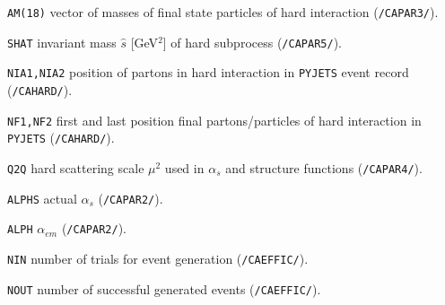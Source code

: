 \documentclass[11pt]{article} \usepackage{mystyle-new}
\newcommand{\deflab}[1]{#1\hfil}%
\newenvironment{defl}[1]%
  {\begin{list}{}{\settowidth{\labelwidth}{#1}%
  \setlength{\leftmargin}{\labelwidth}%
  \addtolength{\leftmargin}{\labelsep}%
  \setlength{\itemsep}{0pt plus 1pt}
  \setlength{\parsep}{0pt plus 1pt}
  \setlength{\topsep}{0pt plus 1pt}
  \setlength{\partopsep}{0pt plus 1pt}
  \setlength{\parskip}{2mm plus 1mm minus 1mm}
  \let\makelabel\deflab}}%
  {\end{list}}
\begin{document}
\begin{defl}{123456789012345}
\item[{\tt AM(18)}] 
 vector of masses of final state particles of hard
                         interaction ({\tt /CAPAR3/}).
\item[{\tt SHAT}] 
                        invariant mass $\hat{s}$ [GeV$^2$]
                     of hard subprocess ({\tt /CAPAR5/}).

\item[{\tt NIA1,NIA2}] 
 position of partons in hard interaction in
                         {\tt PYJETS} event record ({\tt /CAHARD/}).
\item[{\tt NF1,NF2}]  first and last position final
                         partons/particles of
                         hard interaction in {\tt PYJETS} ({\tt /CAHARD/}).
\item[{\tt Q2Q}]  hard scattering scale $\mu ^2$ used in
                         $\alpha_s$ and structure functions ({\tt /CAPAR4/}).
\item[{\tt ALPHS}]  actual $\alpha_s$ ({\tt /CAPAR2/}).
\item[{\tt ALPH}]  $\alpha_{em}$ ({\tt /CAPAR2/}).
\item[{\tt NIN}]  
number of trials for event generation ({\tt /CAEFFIC/}).
\item[{\tt NOUT}]  number of successful generated events 
({\tt /CAEFFIC/}).


\end{defl}
\end{document}
